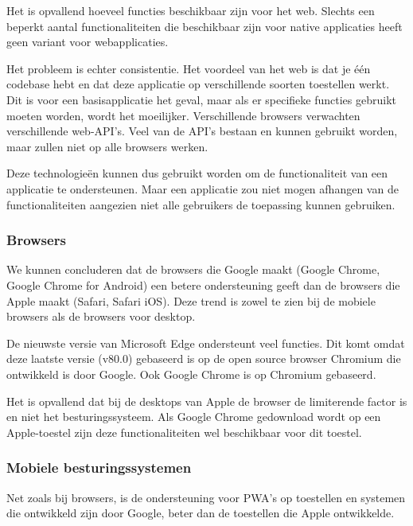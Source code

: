 		Het is opvallend hoeveel functies beschikbaar zijn voor het web. Slechts een beperkt aantal functionaliteiten die beschikbaar zijn voor native applicaties heeft geen variant voor webapplicaties.
		
		Het probleem is echter consistentie. Het voordeel van het web is dat je één codebase hebt en dat deze applicatie op verschillende soorten toestellen werkt. Dit is voor een basisapplicatie het geval, maar als er specifieke functies gebruikt moeten worden, wordt het moeilijker. Verschillende browsers verwachten verschillende web-API's. Veel van de API's bestaan en kunnen gebruikt worden, maar zullen niet op alle browsers werken.
		
		Deze technologieën kunnen dus gebruikt worden om de functionaliteit van een applicatie te ondersteunen. Maar een applicatie zou niet mogen afhangen van de functionaliteiten aangezien niet alle gebruikers de toepassing kunnen gebruiken.
		
	
	
	\subsubsection{Browsers}
	
		We kunnen concluderen dat de browsers die Google maakt (Google Chrome, Google Chrome for Android) een betere ondersteuning geeft dan de browsers die Apple maakt (Safari, Safari iOS). Deze trend is zowel te zien bij de mobiele browsers als de browsers voor desktop.
		
		De nieuwste versie van Microsoft Edge ondersteunt veel functies. Dit komt omdat deze laatste versie (v80.0) gebaseerd is op de open source browser Chromium die ontwikkeld is door Google. Ook Google Chrome is op Chromium gebaseerd.
		
		Het is opvallend dat bij de desktops van Apple de browser de limiterende factor is en niet het besturingssysteem. Als Google Chrome gedownload wordt op een Apple-toestel zijn deze functionaliteiten wel beschikbaar voor dit toestel.
		
		
	
	\subsubsection{Mobiele besturingssystemen }
	
		Net zoals bij browsers, is de ondersteuning voor PWA's op toestellen en systemen die ontwikkeld zijn door Google, beter dan de toestellen die Apple ontwikkelde.
		
